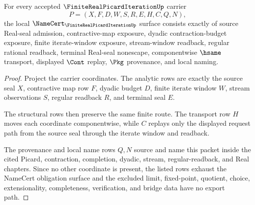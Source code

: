 \begin{theorem}
\label{thm:finite-real-picard-iteration-namecert-obligations}
For every accepted $\FiniteRealPicardIterationUp$ carrier
$$
P=(X,F,D,W,S,R,E,H,C,Q,N),
$$
the local $\NameCert_{\FiniteRealPicardIterationUp}$ surface consists exactly of source Real-seal admission, contractive-map exposure, dyadic contraction-budget exposure, finite iterate-window exposure, stream-window readback, regular rational readback, terminal Real-seal nonescape, componentwise $\hsame$ transport, displayed $\Cont$ replay, $\Pkg$ provenance, and local naming.
\end{theorem}
\begin{proof}
Project the carrier coordinates. The analytic rows are exactly the source seal $X$, contractive map row $F$, dyadic budget $D$, finite iterate window $W$, stream observations $S$, regular readback $R$, and terminal seal $E$.

The structural rows then preserve the same finite route. The transport row $H$ moves each coordinate componentwise, while $C$ replays only the displayed request path from the source seal through the iterate window and readback.

The provenance and local name rows $Q,N$ source and name this packet inside the cited Picard, contraction, completion, dyadic, stream, regular-readback, and Real chapters. Since no other coordinate is present, the listed rows exhaust the NameCert obligation surface and the excluded limit, fixed-point, quotient, choice, extensionality, completeness, verification, and bridge data have no export path.
\end{proof}

